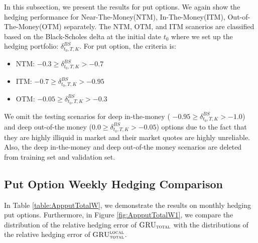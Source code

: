 \documentclass[letterpaper,12pt,titlepage,oneside,final]{book}
\numberwithin{equation}{section}
\theoremstyle{definition}
\newcommand{\modelT}{\textsc{GRU}_{\textsc{total}}}
\newcommand{\modelL}{\textsc{GRU}_{\textsc{total}}^{\textsc{local}}}
\begin{document}
In this subsection, we present the results for put options. We again show the hedging performance for Near-The-Money(NTM), In-The-Money(ITM), Out-of-The-Money(OTM) separately.  The NTM, OTM, and ITM scanerios are classified based on the Black-Scholes delta at the initial date $t_0$ where we set up the hedging portfolio: $\delta^{BS}_{t_0,T,K}$. For put option, the criteria is:
\begin{itemize}
	\item  NTM: $-0.3 \geq \delta^{BS}_{t_0,T,K} >-0.7$
	\item ITM: $-0.7 \geq \delta^{BS}_{t_0,T,K} >-0.95$
	\item  OTM: $-0.05 \geq \delta^{BS}_{t_0,T,K} >-0.3$
\end{itemize}
We omit the testing scenarios for deep in-the-money ( $-0.95 \geq \delta^{BS}_{t_0,T,K} >-1.0$) and deep out-of-the money ($0.0 \geq \delta^{BS}_{t_0,T,K} >-0.05$) options due to the fact that they are highly illiquid in market and their market quotes are highly unreliable. Also, the deep in-the-money and deep out-of-the money scenarios are deleted from training set and validation set.
\subsection{Put Option Weekly Hedging Comparison}
In Table \ref{table:AppputTotalW}, we demonstrate the results on monthly hedging put options. Furthermore, in Figure \ref{fig:AppputTotalW1}, we compare the distribution of the relative hedging error of $\modelT$ with the distributions of the relative hedging error of $\modelL$.
\end{document}
